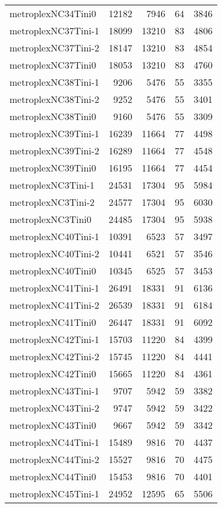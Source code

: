 \begin{longtable}{lrrrr}
metroplexNC34Tini0 & 12182 & 7946 & 64 & 3846 \\
metroplexNC37Tini-1 & 18099 & 13210 & 83 & 4806 \\
metroplexNC37Tini-2 & 18147 & 13210 & 83 & 4854 \\
metroplexNC37Tini0 & 18053 & 13210 & 83 & 4760 \\
metroplexNC38Tini-1 & 9206 & 5476 & 55 & 3355 \\
metroplexNC38Tini-2 & 9252 & 5476 & 55 & 3401 \\
metroplexNC38Tini0 & 9160 & 5476 & 55 & 3309 \\
metroplexNC39Tini-1 & 16239 & 11664 & 77 & 4498 \\
metroplexNC39Tini-2 & 16289 & 11664 & 77 & 4548 \\
metroplexNC39Tini0 & 16195 & 11664 & 77 & 4454 \\
metroplexNC3Tini-1 & 24531 & 17304 & 95 & 5984 \\
metroplexNC3Tini-2 & 24577 & 17304 & 95 & 6030 \\
metroplexNC3Tini0 & 24485 & 17304 & 95 & 5938 \\
metroplexNC40Tini-1 & 10391 & 6523 & 57 & 3497 \\
metroplexNC40Tini-2 & 10441 & 6521 & 57 & 3546 \\
metroplexNC40Tini0 & 10345 & 6525 & 57 & 3453 \\
metroplexNC41Tini-1 & 26491 & 18331 & 91 & 6136 \\
metroplexNC41Tini-2 & 26539 & 18331 & 91 & 6184 \\
metroplexNC41Tini0 & 26447 & 18331 & 91 & 6092 \\
metroplexNC42Tini-1 & 15703 & 11220 & 84 & 4399 \\
metroplexNC42Tini-2 & 15745 & 11220 & 84 & 4441 \\
metroplexNC42Tini0 & 15665 & 11220 & 84 & 4361 \\
metroplexNC43Tini-1 & 9707 & 5942 & 59 & 3382 \\
metroplexNC43Tini-2 & 9747 & 5942 & 59 & 3422 \\
metroplexNC43Tini0 & 9667 & 5942 & 59 & 3342 \\
metroplexNC44Tini-1 & 15489 & 9816 & 70 & 4437 \\
metroplexNC44Tini-2 & 15527 & 9816 & 70 & 4475 \\
metroplexNC44Tini0 & 15453 & 9816 & 70 & 4401 \\
metroplexNC45Tini-1 & 24952 & 12595 & 65 & 5506 \\

\end{longtable}
